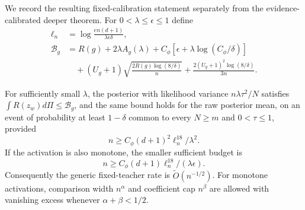 We record the resulting fixed-calibration statement separately from the evidence-calibrated deeper theorem. For $0<\lambda\le\epsilon\le1$ define
\[
 \begin{aligned}
 \ell_n&=\log\frac{en(d+1)}{\lambda\epsilon\delta},\\
 \mathcal B_g&=R(g)+2\lambda A_g(\lambda)
 +C_\phi[\epsilon+\lambda\log(C_\phi/\delta)]\\
 &\quad +(U_g+1)\sqrt{\frac{2R(g)\log(8/\delta)}n}
 +\frac{2(U_g+1)^2\log(8/\delta)}{3n}.
 \end{aligned}
\]
\begin{proposition}
\label{prop:shallow}
For sufficiently small $\lambda$, the posterior with likelihood variance $n\lambda\tau^2/N$ satisfies
$\int R(z_w)d\Pi\le\mathcal B_g$, and the same bound holds for the raw posterior mean, on an event of probability at least $1-\delta$ common to every $N\ge m$ and $0<\tau\le1$, provided
\[
 n\ge C_\phi(d+1)^2\ell_n^{18}/\lambda^2.
\]
If the activation is also monotone, the smaller sufficient budget is
\[
 n\ge C_\phi(d+1)\ell_n^{18}/(\lambda\epsilon).
\]
Consequently the generic fixed-teacher rate is $\widetilde O(n^{-1/2})$. For monotone activations, comparison width $n^\alpha$ and coefficient cap $n^\beta$ are allowed with vanishing excess whenever $\alpha+\beta<1/2$.
\end{proposition}
